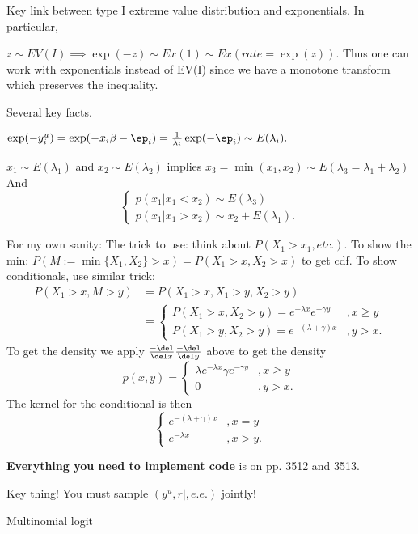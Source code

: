 \documentclass{article}
\begin{document}
\begin{outline}
\1 Key link between type I extreme value distribution and exponentials.  In
particular,

  \2 $z \sim EV(I) \implies \exp(-z) \sim Ex(1) \sim Ex(rate=\exp(z))$.  Thus
  one can work with exponentials instead of EV(I) since we have a monotone
  transform which preserves the inequality.

  \2 Several key facts.

  \3 $\exp(-y_i^u) = \exp(-x_i \beta - \ep_i) = \frac{1}{\lambda_i} \exp(-\ep_i) \sim
  E(\lambda_i).$

  \3 $x_1 \sim E(\lambda_1)$ and $x_2 \sim E(\lambda_2)$ implies 
  $x_3 = \min(x_1, x_2) \sim E(\lambda_3 = \lambda_1 + \lambda_2)$
  And
  \[
  \begin{cases}
  p(x_1 | x_1 < x_2) \sim E(\lambda_3) \\
  p(x_1 | x_1 > x_2) \sim x_2 + E(\lambda_1).
  \end{cases}
  \]

  For my own sanity: The trick to use: think about $P(X_1 > x_1, etc.)$.  To
  show the min: $P(M:=\min\{X_1,X_2\} > x) = P(X_1 > x, X_2 > x)$ to get cdf.  To
  show conditionals, use similar trick:
  \begin{align*}
  P(X_1 > x, M > y) & = P(X_1 > x, X_1 > y, X_2 > y) \\
  & =
  \begin{cases}
    P(X_1 > x, X_2 > y) = e^{-\lambda x} e^{-\gamma y} &, x \geq y \\
    P(X_1 > y, X_2 > y) = e^{-(\lambda + \gamma)x} &, y > x.
  \end{cases}
  \end{align*}
  To get the density we apply $\frac{-\del}{\del x} \frac{-\del}{\del y}$ above
  to get the density
  \[
  p(x,y) =
  \begin{cases}
    \lambda e^{ -\lambda x} \gamma e^{ - \gamma y} &, x \geq y \\
    0 &, y > x.
  \end{cases}
  \]
  The kernel for the conditional is then
  \[
  \begin{cases}
    e^{-(\lambda + \gamma)x} &, x=y \\
    e^{-\lambda x} &, x > y.
  \end{cases}
  \]

\1 \textbf{Everything you need to implement code} is on pp. 3512 and 3513.

  \2 Key thing!  You must sample $(y^u, r \mid, e.e.)$ jointly!

\1 Multinomial logit


\end{outline}
\end{document}
